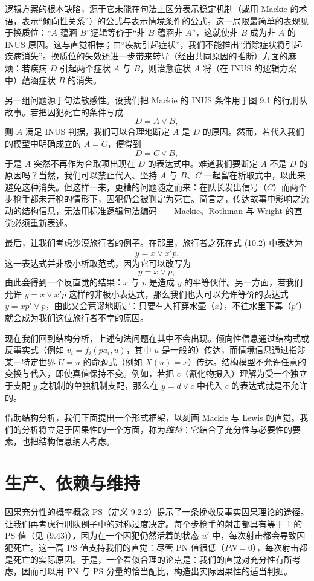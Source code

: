 逻辑方案的根本缺陷，源于它未能在句法上区分表示稳定机制（或用 Mackie 的术语，表示“倾向性关系”）的公式与表示情境条件的公式。这一局限最简单的表现见于换质位：“$A$ 蕴涵 $B$”逻辑等价于“非 $B$ 蕴涵非 $A$”，这就使非 $B$ 成为非 $A$ 的 INUS 原因。这与直觉相悖；由“疾病引起症状”，我们不能推出“消除症状将引起疾病消失”。换质位的失效还进一步带来转导（经由共同原因的推断）方面的麻烦：若疾病 $D$ 引起两个症状 $A$ 与 $B$，则治愈症状 $A$ 将（在 INUS 的逻辑方案中）蕴涵症状 $B$ 的消失。

另一组问题源于句法敏感性。设我们把 Mackie 的 INUS 条件用于图 9.1 的行刑队故事。若把囚犯死亡的条件写成
\[
D=A\vee B,
\]
则 $A$ 满足 INUS 判据，我们可以合理地断定 $A$ 是 $D$ 的原因。然而，若代入我们的模型中明确成立的 $A=C$，便得到
\[
D=C\vee B,
\]
于是 $A$ 突然不再作为合取项出现在 $D$ 的表达式中。难道我们要断定 $A$ 不是 $D$ 的原因吗？当然，我们可以禁止代入、坚持 $A$ 与 $B$、$C$ 一起留在析取式中，以此来避免这种消失。但这样一来，更糟的问题随之而来：在队长发出信号（$C$）而两个步枪手都未开枪的情形下，囚犯仍会被判定为死亡。简言之，传达故事中影响之流动的结构信息，无法用标准逻辑句法编码——Mackie、Rothman 与 Wright 的直觉必须重新表述。

最后，让我们考虑沙漠旅行者的例子。在那里，旅行者之死在式 \textup{(10.2)} 中表达为
\[
y=x\vee x'p.
\]
这一表达式并非极小析取范式，因为它可以改写为
\[
y=x\vee p,
\]
由此会得到一个反直觉的结果：$x$ 与 $p$ 是造成 $y$ 的平等伙伴。另一方面，若我们允许 $y=x\vee x'p$ 这样的非极小表达式，那么我们也大可以允许等价的表达式 $y=xp'\vee p$，由此又会荒谬地断定：只要有人打穿水壶（$x$），不往水里下毒（$p'$）就会成为我们这位旅行者不幸的原因。

现在我们回到结构分析，上述句法问题在其中不会出现。倾向性信息通过结构式或反事实式（例如 $v_i=f_i(pa_i,u)$，其中 $u$ 是一般的）传达，而情境信息通过指涉某一特定世界 $U=u$ 的命题式（例如 $X(u)=x$）传达。结构模型不允许任意的变换与代入，即使真值保持不变。例如，若把 $c$（氰化物摄入）理解为受一个独立于支配 $y$ 之机制的单独机制支配，那么在 $y=d\vee c$ 中代入 $c$ 的表达式就是不允许的。

借助结构分析，我们下面提出一个形式框架，以刻画 Mackie 与 Lewis 的直觉。我们的分析将立足于因果性的一个方面，称为\emph{维持}：它结合了充分性与必要性的要素，也把结构信息纳入考虑。

\section{生产、依赖与维持}

因果充分性的概率概念 PS（定义 9.2.2）提示了一条挽救反事实因果理论的途径。让我们再考虑行刑队例子中的对称过度决定。每个步枪手的射击都具有等于 1 的 PS 值（见 \textup{(9.43)}），因为在一个囚犯仍然活着的状态 $u'$ 中，每次射击都会导致囚犯死亡。这一高 PS 值支持我们的直觉：尽管 PN 值很低（$PN=0$），每次射击都是死亡的实际原因。于是，一个看似合理的论点是：我们的直觉对充分性有所考虑，因而可以用 PN 与 PS 分量的恰当配比，构造出实际因果性的适当判据。

